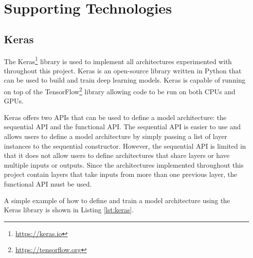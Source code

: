 

\section{Supporting Technologies}

\subsection{Keras}

The Keras\footnote{\url{https://keras.io}} library is used to implement all architectures experimented with throughout this project. Keras is an open-source library written in Python that can be used to build and train deep learning models. Keras is capable of running on top of the TensorFlow\footnote{\url{https://tensorflow.org}} library allowing code to be run on both CPUs and GPUs.

Keras offers two APIs that can be used to define a model architecture: the sequential API and the functional API. The sequential API is easier to use and allows users to define a model architecture by simply passing a list of layer instances to the sequential constructor. However, the sequential API is limited in that it does not allow users to define architectures that share layers or have multiple inputs or outputs. Since the architectures implemented throughout this project contain layers that take inputs from more than one previous layer, the functional API must be used.

A simple example of how to define and train a model architecture using the Keras library is shown in Listing \ref{lst:keras}.
